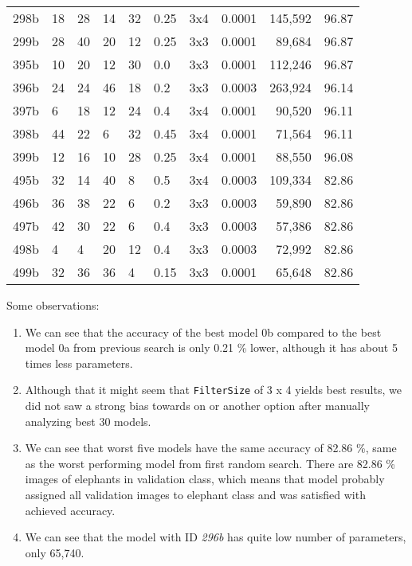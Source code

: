 \begin{table}
\begin{tabular}{llllllllrl}
      298b & 18 & 28 & 14 & 32 & 0.25 & 3x4 & 0.0001 & 145,592 & 96.87\\
      299b & 28 & 40 & 20 & 12 & 0.25 & 3x3 & 0.0001 &  89,684 & 96.87\\\midrule
      395b & 10 & 20 & 12 & 30 & 0.0  & 3x3 & 0.0001 & 112,246 & 96.87\\
      396b & 24 & 24 & 46 & 18 & 0.2  & 3x3 & 0.0003 & 263,924 & 96.14\\
      397b &  6 & 18 & 12 & 24 & 0.4  & 3x4 & 0.0001 &  90,520 & 96.11\\
      398b & 44 & 22 &  6 & 32 & 0.45 & 3x4 & 0.0001 &  71,564 & 96.11\\
      399b & 12 & 16 & 10 & 28 & 0.25 & 3x4 & 0.0001 &  88,550 & 96.08\\\midrule
      495b & 32 & 14 & 40 &  8 & 0.5  & 3x4 & 0.0003 & 109,334 & 82.86\\
      496b & 36 & 38 & 22 &  6 & 0.2  & 3x3 & 0.0003 &  59,890 & 82.86\\
      497b & 42 & 30 & 22 &  6 & 0.4  & 3x3 & 0.0003 &  57,386 & 82.86\\
      498b &  4 &  4 & 20 & 12 & 0.4  & 3x3 & 0.0003 &  72,992 & 82.86\\
      499b & 32 & 36 & 36 &  4 & 0.15 & 3x3 & 0.0001 &  65,648 & 82.86\\\bottomrule
    \end{tabular}
    \label{hyper_results2}
\end{table}

Some observations:
\begin{enumerate}
    \item We can see that the accuracy of the best model 0b compared to the best model 0a from previous search is only 0.21 \% lower, although it has about 5 times less parameters.
    \item Although that it might seem that \verb|FilterSize| of 3 x 4 yields best results, we did not saw a strong bias towards on or another option after manually analyzing best 30 models.
    \item We can see that worst five models have the same accuracy of 82.86 \%, same as the worst performing model from first random search. There are 82.86 \% images of elephants in validation class, which means that model probably assigned all validation images to elephant class and was satisfied with achieved accuracy.
    \item We can see that the model with ID \textit{296b} has quite low number of parameters, only 65,740.
\end{enumerate}

